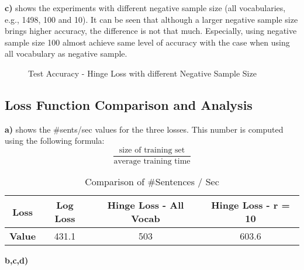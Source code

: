 \documentclass{article}
\begin{document}
\textbf{c)}  shows the experiments with different negative sample size (all vocabularies, e.g., 1498, 100 and 10). It can be seen that although a larger negative sample size brings higher accuracy, the difference is not that much. Especially, using negative sample size 100 almost achieve same level of accuracy with the case when using all vocabulary as negative sample.

\begin{figure}
\centering
{}
\caption{Test Accuracy - Hinge Loss with different Negative Sample Size}
\label{fig:hinge_3}
\end{figure}

\subsection{Loss Function Comparison and Analysis}
\textbf{a)}  shows the \#sents/sec values for the three losses. This number is computed using the following formula:
\[
\frac{\text{size of training set}}{\text{average training time}}
\]
\begin{table}
\begin{tabular}{c|c|c|c}
\textbf{Loss} & Log Loss & Hinge Loss - All Vocab & Hinge Loss - r = 10 \\
\hline
\textbf{Value} & 431.1& 503&603.6 \\
\end{tabular}
\caption{Comparison of \#Sentences / Sec}
\label{tab:sent_sec}
\end{table}

\textbf{b,c,d)} 
\end{document}
